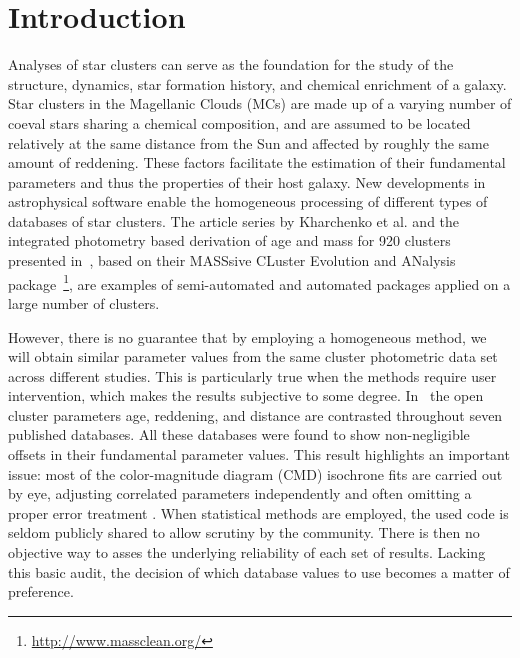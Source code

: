 \documentclass{aa}
\begin{document}
\maketitle
%

\section{Introduction}
\label{sec:intro}

Analyses of star clusters can serve as the foundation for the study of the
structure, dynamics, star formation history, and chemical enrichment of a
galaxy.
Star clusters in the Magellanic Clouds (MCs) are made up of a varying number of
coeval stars sharing a chemical composition, and are assumed to
be located relatively at the same distance from the Sun and affected by roughly
the same amount of reddening. These factors facilitate the estimation of
their fundamental parameters and thus the properties of their host galaxy.
%
New developments in astrophysical software enable the homogeneous
processing of different types of databases of star clusters. The article series
by Kharchenko et al. 
\citep[see][and references therein]{Kharchenko_2005,Schmeja_2014}
and the integrated photometry based derivation of age and mass for 920 clusters
presented
in~\cite{Popescu_2012}, based on their MASSsive CLuster Evolution and
ANalysis package~\citep[MASSCLEAN;][]{Popescu_2009}\footnote{
\url{http://www.massclean.org/}}, are examples of semi-automated and automated
packages applied on a large number of clusters.

However, there is no guarantee that by employing a homogeneous method, we will
obtain similar parameter values from the same cluster photometric
data set across different studies. This is particularly true when the methods
require user intervention, which makes the results subjective to some degree.
%
In~\cite{Netopil_2015} the open cluster parameters age, reddening, and distance
are contrasted throughout seven published databases. All these databases were
found to show non-negligible offsets in their fundamental parameter
values.
%
This result highlights an important issue: most of the color-magnitude diagram 
(CMD) isochrone fits are carried out by eye, adjusting correlated parameters
independently and often omitting a proper error treatment \citep[see]
[for a more detailed description of this problem]{vonHippel_2014}.
%
When statistical methods are employed, the used code is seldom publicly
shared to allow scrutiny by the community. There is then no objective way to
asses the underlying reliability of each set of results.
Lacking this basic audit, the decision of which database values to use
becomes a matter of preference.
\end{document}
